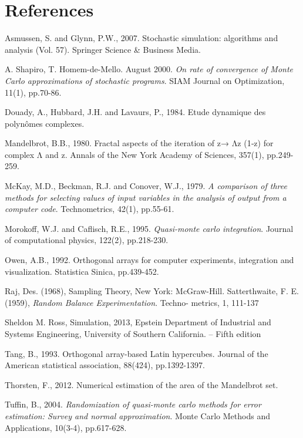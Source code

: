 \documentclass{article}
\begin{document}
    \clearpage

    \section*{References}
    \item Asmussen, S. and Glynn, P.W., 2007. Stochastic simulation: algorithms and analysis (Vol. 57). Springer Science & Business Media.
    \item A. Shapiro, T. Homem-de-Mello. August 2000. \emph{On rate of convergence of Monte Carlo approximations of stochastic programs}. SIAM Journal on Optimization, 11(1), pp.70-86.
    \item Douady, A., Hubbard, J.H. and Lavaurs, P., 1984. Etude dynamique des polynômes complexes.
    \item Mandelbrot, B.B., 1980. Fractal aspects of the iteration of z→ Λz (1‐z) for complex Λ and z. Annals of the New York Academy of Sciences, 357(1), pp.249-259.
    \item McKay, M.D., Beckman, R.J. and Conover, W.J., 1979. \emph{A comparison of three methods for selecting values of input variables in the analysis of output from a computer code}. Technometrics, 42(1), pp.55-61.
    \item Morokoff, W.J. and Caflisch, R.E., 1995. \emph{Quasi-monte carlo integration}. Journal of computational physics, 122(2), pp.218-230.
    \item Owen, A.B., 1992. Orthogonal arrays for computer experiments, integration and visualization. Statistica Sinica, pp.439-452.
    \item Raj, Des. (1968), Sampling Theory, New York: McGraw-Hill. Satterthwaite, F. E. (1959), \emph{Random Balance Experimentation}. Techno- metrics, 1, 111-137
    \item Sheldon M. Ross, Simulation, 2013,  Epstein Department of Industrial and Systems
    Engineering, University of Southern California. – Fifth edition
    \item Tang, B., 1993. Orthogonal array-based Latin hypercubes. Journal of the American statistical association, 88(424), pp.1392-1397.
    \item Thorsten, F., 2012. Numerical estimation of the area of the Mandelbrot set.
    \item Tuffin, B., 2004. \emph{Randomization of quasi-monte carlo methods for error estimation: Survey and normal approximation}. Monte Carlo Methods and Applications, 10(3-4), pp.617-628.

    \clearpage
\end{document}
